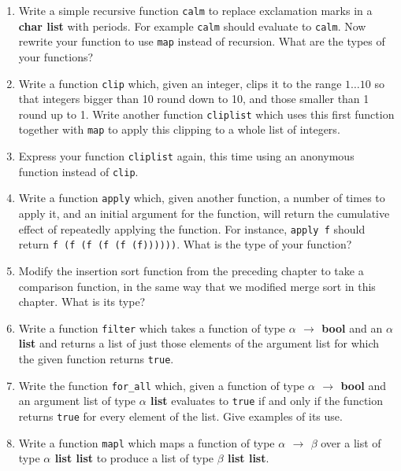 \documentclass[]{book}
\newcommand\upquote[1]{\textquotesingle#1\textquotesingle}
\begin{document}
\begin{enumerate}
  \item Write a simple recursive function \texttt{calm} to replace exclamation marks in a \textbf{\textsf{char list}} with periods. For example \texttt{calm\! [\upquote{H};\! \upquote{e};\! \upquote{l};\! \upquote{p};\! \upquote{!};\! \upquote{ };\! \upquote{F};\! \upquote{i};\! \upquote{r};\! \upquote{e};\! \upquote{!}]} should evaluate to \texttt{calm\! [\upquote{H};\! \upquote{e};\! \upquote{l};\! \upquote{p};\! \upquote{.};\! \upquote{ };\! \upquote{F};\! \upquote{i};\! \upquote{r};\! \upquote{e};\! \upquote{.}]}. Now rewrite your function to use \texttt{map} instead of recursion. What are the types of your functions?
  \item Write a function \texttt{clip} which, given an integer, clips it to the range $1\ldots 10$ so that integers bigger than 10 round down to 10, and those smaller than 1 round up to 1. Write another function \texttt{cliplist} which uses this first function together with \texttt{map} to apply this clipping to a whole list of integers.
  \item Express your function \texttt{cliplist} again, this time using an anonymous function instead of \texttt{clip}.
  \item Write a function \texttt{apply} which, given another function, a number of times to apply it, and an initial argument for the function, will return the cumulative effect of repeatedly applying the function. For instance, \texttt{apply\! f} should return \texttt{f\! (f\! (f\! (f\! (f\! (f))))))}. What is the type of your function?
  \item Modify the insertion sort function from the preceding chapter to take a comparison function, in the same way that we modified merge sort in this chapter. What is its type?
  \item Write a function \texttt{filter} which takes a function of type \textbf{\textsf{$\alpha$ $\rightarrow$ bool}} and an \textsf{\textbf{$\alpha$ list}} and returns a list of just those elements of the argument list for which the given function returns \texttt{true}.
  \item Write the function \texttt{for\_all} which, given a function of type \textbf{\textsf{$\alpha$ $\rightarrow$ bool}} and an argument list of type \textsf{\textbf{$\alpha$ list}} evaluates to \texttt{true} if and only if the function returns \texttt{true} for every element of the list. Give examples of its use.
  \item Write a function \texttt{mapl} which maps a function of type \textbf{\textsf{$\alpha$ $\rightarrow$ $\beta$}} over a list of type \textbf{\textsf{$\alpha$ list list}} to produce a list of type \textbf{\textsf{$\beta$ list list}}.
\end{enumerate}
\end{document}
